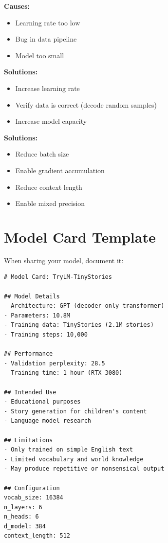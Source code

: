 \begin{pitfall}[title=Loss Not Decreasing]
\textbf{Causes:}
\begin{itemize}
    \item Learning rate too low
    \item Bug in data pipeline
    \item Model too small
\end{itemize}
\textbf{Solutions:}
\begin{itemize}
    \item Increase learning rate
    \item Verify data is correct (decode random samples)
    \item Increase model capacity
\end{itemize}
\end{pitfall}

\begin{pitfall}[title=Out of Memory]
\textbf{Solutions:}
\begin{itemize}
    \item Reduce batch size
    \item Enable gradient accumulation
    \item Reduce context length
    \item Enable mixed precision
\end{itemize}
\end{pitfall}

\section{Model Card Template}

When sharing your model, document it:

\begin{lstlisting}[style=yaml]
# Model Card: TryLM-TinyStories

## Model Details
- Architecture: GPT (decoder-only transformer)
- Parameters: 10.8M
- Training data: TinyStories (2.1M stories)
- Training steps: 10,000

## Performance
- Validation perplexity: 28.5
- Training time: 1 hour (RTX 3080)

## Intended Use
- Educational purposes
- Story generation for children's content
- Language model research

## Limitations
- Only trained on simple English text
- Limited vocabulary and world knowledge
- May produce repetitive or nonsensical output

## Configuration
vocab_size: 16384
n_layers: 6
n_heads: 6
d_model: 384
context_length: 512
\end{lstlisting}


